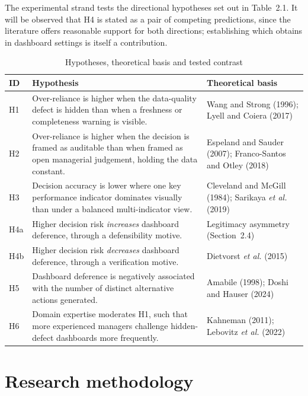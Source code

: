 \documentclass[11pt,a4paper]{article}
\numberwithin{figure}{section}
\numberwithin{table}{section}
\newcommand{\xref}[1]{\textcolor{citeblue}{#1}}         %
\begin{document}
The experimental strand tests the directional hypotheses set out in \xref{Table~2.1}. It will be
observed that H4 is stated as a pair of competing predictions, since the literature offers
reasonable support for both directions; establishing which obtains in dashboard settings is itself
a contribution.

\begin{table}[H]
\centering\small
\caption{Hypotheses, theoretical basis and tested contrast}
\label{tab:hyp}
\begin{tabularx}{\textwidth}{@{}p{0.7cm} X p{4.0cm}@{}}
\toprule
\textbf{ID} & \textbf{Hypothesis} & \textbf{Theoretical basis} \\
\midrule
H1 & Over-reliance is higher when the data-quality defect is hidden than when a freshness or
completeness warning is visible. & Wang and Strong (1996); Lyell and Coiera (2017) \\
H2 & Over-reliance is higher when the decision is framed as auditable than when framed as open
managerial judgement, holding the data constant. & Espeland and Sauder (2007); Franco-Santos and
Otley (2018) \\
H3 & Decision accuracy is lower where one key performance indicator dominates visually than under a
balanced multi-indicator view. & Cleveland and McGill (1984); Sarikaya \emph{et al.} (2019) \\
H4a & Higher decision risk \emph{increases} dashboard deference, through a defensibility motive. &
Legitimacy asymmetry (Section~2.4) \\
H4b & Higher decision risk \emph{decreases} dashboard deference, through a verification motive. &
Dietvorst \emph{et al.} (2015) \\
H5 & Dashboard deference is negatively associated with the number of distinct alternative actions
generated. & Amabile (1998); Doshi and Hauser (2024) \\
H6 & Domain expertise moderates H1, such that more experienced managers challenge hidden-defect
dashboards more frequently. & Kahneman (2011); Lebovitz \emph{et al.} (2022) \\
\bottomrule
\end{tabularx}
\end{table}

\section{Research methodology}
\end{document}
